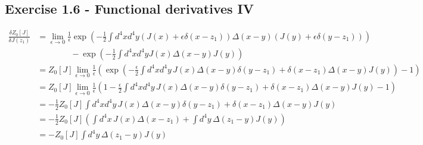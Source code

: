 \documentclass[../main.tex]{subfiles}
\begin{document}
\subsection*{Exercise 1.6 - Functional derivatives IV}
\begin{align}
\frac{\delta Z_0[J]}{\delta J(z_1)}
&=\lim_{\epsilon\rightarrow0}\frac{1}{\epsilon}\exp\left(-\frac{1}{2}\int d^4xd^4y(J(x)+\epsilon\delta(x-z_1))\Delta(x-y)(J(y)+\epsilon\delta(y-z_1))\right)\\
&\qquad\qquad-\exp\left(-\frac{1}{2}\int d^4xd^4yJ(x)\Delta(x-y)J(y)\right)\\
&=Z_0[J]\lim_{\epsilon\rightarrow0}\frac{1}{\epsilon}\left(\exp\left(-\frac{\epsilon}{2}\int d^4xd^4y\, J(x)\Delta(x-y)\delta(y-z_1)+\delta(x-z_1)\Delta(x-y)J(y)\right)-1\right)\\
&=Z_0[J]\lim_{\epsilon\rightarrow0}\frac{1}{\epsilon}\left(1-\frac{\epsilon}{2}\int d^4xd^4y\, J(x)\Delta(x-y)\delta(y-z_1)+\delta(x-z_1)\Delta(x-y)J(y)-1\right)\\
&=-\frac{1}{2}Z_0[J]\int d^4xd^4y\, J(x)\Delta(x-y)\delta(y-z_1)+\delta(x-z_1)\Delta(x-y)J(y)\\
&=-\frac{1}{2}Z_0[J]\left(\int d^4x\, J(x)\Delta(x-z_1)+\int d^4y\,\Delta(z_1-y)J(y)\right)\\
&=-Z_0[J]\int d^4y\,\Delta(z_1-y)J(y)
\end{align}
\end{document}
